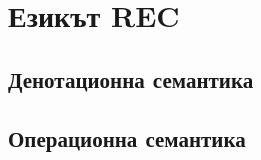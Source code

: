 \chapter{Езикът {\bf REC}}
\label{ch:rec}



\section{Денотационна семантика}











\section{Операционна семантика}



\newpage







% 

